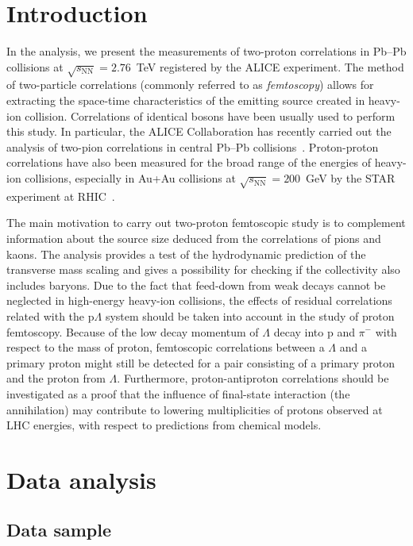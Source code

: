 \newpage
\section{Introduction}
\label{sec:overview}
In the analysis, we present the measurements of two-proton correlations in Pb--Pb collisions at $\sqrt{s_{\mathrm{NN}}}=2.76$~TeV registered by the ALICE experiment. The method of two-particle correlations (commonly referred to as \emph{femtoscopy})  allows for extracting the space-time characteristics of the emitting source created in heavy-ion collision. Correlations of identical bosons have been usually used to perform this study. In particular, the ALICE Collaboration has recently carried out the analysis of two-pion correlations in central Pb--Pb collisions~\cite{Mercado}. Proton-proton correlations have also been measured for the broad range of the energies of heavy-ion collisions, especially in Au+Au collisions at $\sqrt{s_{\mathrm{NN}}}=200$~GeV by the STAR experiment at RHIC~\cite{HZ}.

The main motivation to carry out two-proton femtoscopic study is to complement information about the source size deduced from the correlations of pions and kaons. The analysis provides a test of the hydrodynamic prediction of the transverse mass scaling and gives a possibility for checking if the collectivity also includes baryons. Due to the fact that feed-down from weak decays cannot be neglected in high-energy heavy-ion collisions, the effects of residual correlations related with the p$\Lambda$ system should be taken into account in the study of proton femtoscopy. Because of the low decay momentum of $\Lambda$ decay into p and $\pi^{-}$ with respect to the mass of proton, femtoscopic correlations between a $\Lambda$ and a primary proton might still be detected for a pair consisting of a primary proton and the proton from $\Lambda$. Furthermore, proton-antiproton correlations should be investigated as a proof that the influence of final-state interaction (the annihilation) may contribute to lowering multiplicities of protons observed at LHC energies, with respect to predictions from chemical models.

\section{Data analysis}
\label{sec:analysis}
\subsection{Data sample}
